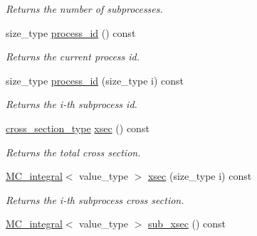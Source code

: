 \begin{DoxyCompactItemize}
\begin{DoxyCompactList}\small\item\em Returns the number of subprocesses. \end{DoxyCompactList}\item 
\hypertarget{a00212_a31ce4caa34a16c247b9d4fa2117fd600}{}size\+\_\+type \hyperlink{a00212_a31ce4caa34a16c247b9d4fa2117fd600}{process\+\_\+id} () const \label{a00212_a31ce4caa34a16c247b9d4fa2117fd600}

\begin{DoxyCompactList}\small\item\em Returns the current process id. \end{DoxyCompactList}\item 
\hypertarget{a00212_a74a95eb0629e7bceef53c7f28dcab8a3}{}size\+\_\+type \hyperlink{a00212_a74a95eb0629e7bceef53c7f28dcab8a3}{process\+\_\+id} (size\+\_\+type i) const \label{a00212_a74a95eb0629e7bceef53c7f28dcab8a3}

\begin{DoxyCompactList}\small\item\em Returns the i-\/th subprocess id. \end{DoxyCompactList}\item 
\hypertarget{a00212_ae17439598c4f68624f978b95e9e33567}{}\hyperlink{a00368}{cross\+\_\+section\+\_\+type} \hyperlink{a00212_ae17439598c4f68624f978b95e9e33567}{xsec} () const \label{a00212_ae17439598c4f68624f978b95e9e33567}

\begin{DoxyCompactList}\small\item\em Returns the total cross section. \end{DoxyCompactList}\item 
\hypertarget{a00212_a01a34361ecf9e40142b76a4aef80b2ae}{}\hyperlink{a00368}{M\+C\+\_\+integral}$<$ value\+\_\+type $>$ \hyperlink{a00212_a01a34361ecf9e40142b76a4aef80b2ae}{xsec} (size\+\_\+type i) const \label{a00212_a01a34361ecf9e40142b76a4aef80b2ae}

\begin{DoxyCompactList}\small\item\em Returns the i-\/th subprocess cross section. \end{DoxyCompactList}\item 
\hypertarget{a00212_a11b1d4533738f78407dcddf13dee14b2}{}\hyperlink{a00368}{M\+C\+\_\+integral}$<$ value\+\_\+type $>$ \hyperlink{a00212_a11b1d4533738f78407dcddf13dee14b2}{sub\+\_\+xsec} () const \label{a00212_a11b1d4533738f78407dcddf13dee14b2}


\end{DoxyCompactItemize}
